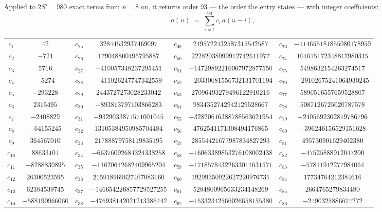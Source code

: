 \documentclass[11pt,a4paper]{article}
\theoremstyle{plain}
\theoremstyle{definition}
\begin{document}
Applied to $2S'=980$ exact terms from $n=8$ on, it returns order $93$ --- the
order the entry states --- with integer coefficients:
\[
a(n)\;=\;\sum_{i=1}^{93}c_i\,a(n-i),
\]
\begin{center}\small
\begin{tabular}{cccccccc}
$c_{1}$ & $42$ & $c_{25}$ & $32844532937469097$ & $c_{49}$ & $2495722432587315542587$ & $c_{73}$ & $-114655181855080178959$ \\
$c_{2}$ & $-721$ & $c_{26}$ & $179048800495795887$ & $c_{50}$ & $22282038999912742611977$ & $c_{74}$ & $104615172348817980345$ \\
$c_{3}$ & $5716$ & $c_{27}$ & $-410057348237295451$ & $c_{51}$ & $-14729892216067972877550$ & $c_{75}$ & $5498632154263274517$ \\
$c_{4}$ & $-5274$ & $c_{28}$ & $-411026247747342559$ & $c_{52}$ & $-20330081556732131701194$ & $c_{76}$ & $-29102675241064930245$ \\
$c_{5}$ & $-293228$ & $c_{29}$ & $2443727273028233042$ & $c_{53}$ & $27096493279496122910216$ & $c_{77}$ & $5890516557659528807$ \\
$c_{6}$ & $2315495$ & $c_{30}$ & $-893813797103866283$ & $c_{54}$ & $9834352742942129528667$ & $c_{78}$ & $5087126725020787578$ \\
$c_{7}$ & $-2408829$ & $c_{31}$ & $-9329033871571001045$ & $c_{55}$ & $-32820616388788563621954$ & $c_{79}$ & $-2405692302819786796$ \\
$c_{8}$ & $-64155245$ & $c_{32}$ & $13105384950985704484$ & $c_{56}$ & $4762541171308494176865$ & $c_{80}$ & $-396246156529151628$ \\
$c_{9}$ & $364567010$ & $c_{33}$ & $21788879758119835195$ & $c_{57}$ & $28554421677987834827293$ & $c_{81}$ & $495730901629402380$ \\
$c_{10}$ & $88633101$ & $c_{34}$ & $-66376092684324338258$ & $c_{58}$ & $-16063389853276108002438$ & $c_{82}$ & $-47525888912047200$ \\
$c_{11}$ & $-8288830895$ & $c_{35}$ & $-11620642682409965204$ & $c_{59}$ & $-17185784322633014631571$ & $c_{83}$ & $-57811912277984064$ \\
$c_{12}$ & $26300523595$ & $c_{36}$ & $215918969627467083160$ & $c_{60}$ & $19299350922627220976731$ & $c_{84}$ & $17734764212384616$ \\
$c_{13}$ & $62384539745$ & $c_{37}$ & $-146654226857729527255$ & $c_{61}$ & $5284800965633234148269$ & $c_{85}$ & $2664765279834480$ \\
$c_{14}$ & $-588190966060$ & $c_{38}$ & $-476938142021213386442$ & $c_{62}$ & $-15332342566026658155380$ & $c_{86}$ & $-2190325886674272$ \\

\end{tabular}
\end{center}
\end{document}
